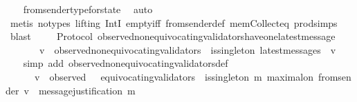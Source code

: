 \begin{isabellebody}
\ \ \isamarkupfalse%
\ from{\isacharunderscore}sender{\isacharunderscore}type{\isacharunderscore}for{\isacharunderscore}state\ \isamarkupfalse%
\ auto\isanewline
\ \ \isamarkupfalse%
\ {\isacharparenleft}metis\ {\isacharparenleft}no{\isacharunderscore}types{\isacharcomma}\ lifting{\isacharparenright}\ IntI\ empty{\isacharunderscore}iff\ from{\isacharunderscore}sender{\isacharunderscore}def\ mem{\isacharunderscore}Collect{\isacharunderscore}eq\ prod{\isachardot}simps{\isacharparenleft}{}{\isacharparenright}{\isacharparenright}\isanewline
\ \ \isamarkupfalse%
\ blast%
\endisatagproof
{\isafoldproof}%
%
\isadelimproof
\ \ \isanewline
%
\endisadelimproof
\isanewline
\isanewline
{}\isamarkupfalse%
\ {\isacharparenleft}\ Protocol{\isacharparenright}\ observed{\isacharunderscore}non{\isacharunderscore}equivocating{\isacharunderscore}validators{\isacharunderscore}have{\isacharunderscore}one{\isacharunderscore}latest{\isacharunderscore}message{\isacharcolon}\isanewline
\ \ {\isachardoublequoteopen}{\isasymforall}\ {\isasymsigma}\ {\isasymin}\ {\isasymSigma}{\isachardot}\ {\isacharparenleft}{\isasymforall}\ v\ {\isasymin}\ observed{\isacharunderscore}non{\isacharunderscore}equivocating{\isacharunderscore}validators\ {\isasymsigma}{\isachardot}\ is{\isacharunderscore}singleton\ {\isacharparenleft}latest{\isacharunderscore}messages\ {\isasymsigma}\ v{\isacharparenright}{\isacharparenright}{\isachardoublequoteclose}\ \ \isanewline
%
\isadelimproof
\ \ %
\endisadelimproof
%
\isatagproof
{}\isamarkupfalse%
\ {\isacharparenleft}simp\ add{\isacharcolon}\ observed{\isacharunderscore}non{\isacharunderscore}equivocating{\isacharunderscore}validators{\isacharunderscore}def{\isacharparenright}\isanewline
{}\isamarkupfalse%
\ {\isacharminus}\isanewline
\ \ \isamarkupfalse%
\ {\isachardoublequoteopen}{\isasymforall}\ {\isasymsigma}\ {\isasymin}\ {\isasymSigma}{\isachardot}\ {\isacharparenleft}{\isasymforall}\ v\ {\isasymin}\ observed\ {\isasymsigma}\ {\isacharminus}\ equivocating{\isacharunderscore}validators\ {\isasymsigma}{\isachardot}\ is{\isacharunderscore}singleton\ {\isacharbraceleft}m{\isachardot}\ maximal{\isacharunderscore}on\ {\isacharparenleft}from{\isacharunderscore}sender\ {\isacharparenleft}v{\isacharcomma}\ {\isasymsigma}{\isacharparenright}{\isacharparenright}\ message{\isacharunderscore}justification\ m{\isacharbraceright}{\isacharparenright}{\isachardoublequoteclose}\isanewline
\ \ \ \ \isamarkupfalse%

\end{isabellebody}

